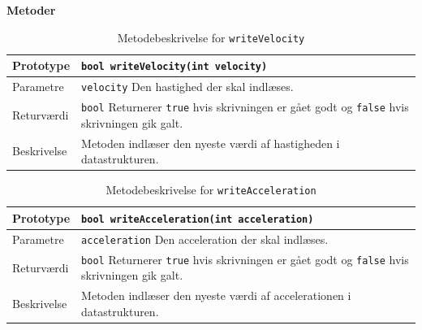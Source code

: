 \textbf{Metoder}
\begin{table}[h]
\begin{tabularx}{\textwidth}{| L{2.5 cm} | Z |} \hline
Prototype & \texttt{bool writeVelocity(int velocity)} \\\hline
Parametre & \texttt{velocity} \newline Den hastighed der skal indlæses. \\\hline
Returværdi &  \texttt{bool} \newline Returnerer \texttt{true} hvis skrivningen er gået godt og \texttt{false} hvis skrivningen gik galt. \\\hline
Beskrivelse & Metoden indlæser den nyeste værdi af hastigheden i datastrukturen. \\\hline
\end{tabularx}
\caption{Metodebeskrivelse for \texttt{writeVelocity}}
\label{table:met_writeVelocity}
\end{table}

\begin{table}[h]
\begin{tabularx}{\textwidth}{| L{2.5 cm} | Z |} \hline
Prototype & \texttt{bool writeAcceleration(int acceleration)} \\\hline
Parametre & \texttt{acceleration} \newline Den acceleration der skal indlæses. \\\hline
Returværdi &  \texttt{bool} \newline Returnerer \texttt{true} hvis skrivningen er gået godt og \texttt{false} hvis skrivningen gik galt. \\\hline
Beskrivelse & Metoden indlæser den nyeste værdi af accelerationen i datastrukturen. \\\hline
\end{tabularx}
\caption{Metodebeskrivelse for \texttt{writeAcceleration}}
\label{table:met_writeAcceleration}
\end{table}

